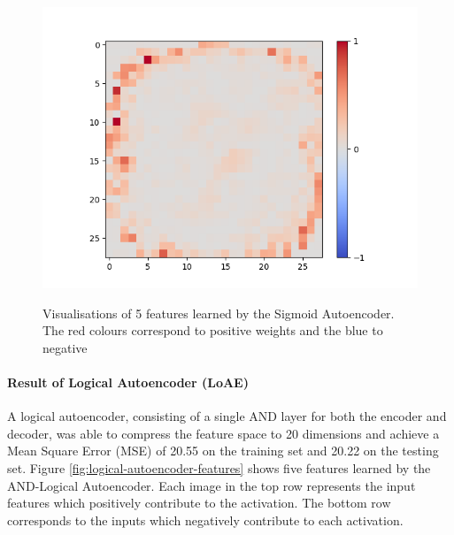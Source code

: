 \begin{figure}[H]
\begin{minipage}[b]{0.19\textwidth}
		\includegraphics[width=\textwidth]{SAE(20LF)/Feature-15.png}
		\label{}
	\end{minipage}
	\caption{Visualisations of 5 features learned by the Sigmoid Autoencoder. The red colours correspond to positive weights and the blue to negative}
	\label{fig:sigmoid-autoencoder-features}
	\hfill
\end{figure}

\paragraph{Result of Logical Autoencoder (LoAE)}
A logical autoencoder, consisting of a single AND layer for both the encoder and decoder, was able to compress the feature space to 20 dimensions and achieve a Mean Square Error (MSE) of 20.55 on the training set and 20.22 on the testing set. Figure \ref{fig:logical-autoencoder-features} shows five features learned by the AND-Logical Autoencoder. Each image in the top row represents the input features which positively contribute to the activation. The bottom row corresponds to the inputs which negatively contribute to each activation. 

